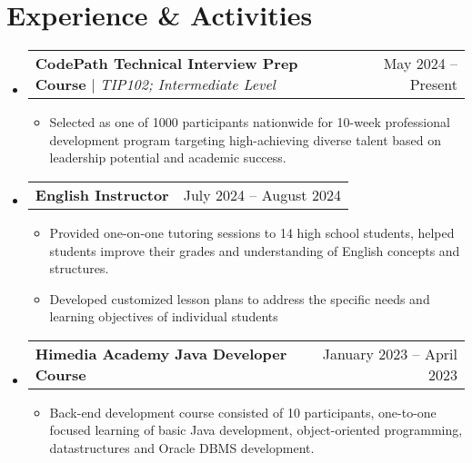 \documentclass[letterpaper,11pt]{article}
\makeatletter
\newcommand{\resumeItem}[1]{
  \item\small{
    {#1 \vspace{-3pt}}
  }
}
\newcommand{\resumeSubheading}[4]{
  \vspace{-2pt}\item
    \begin{tabular*}{0.97\textwidth}[t]{l@{\extracolsep{\fill}}r@{\hspace{-0.2in}}}
        \textbf{#1} & #2 \\
        \textit{\small#3} & \textit{\small #4} \\
    \end{tabular*}\vspace{-1pt}
}
\newcommand{\resumeProjectHeading}[2]{
    \item
    \begin{tabular*}{0.97\textwidth}{l@{\extracolsep{\fill}}r@{\hspace{-0.2in}}}
        \small#1 & #2 \\
    \end{tabular*}\vspace{-7pt}
}
\newcommand{\resumeSubHeadingListStart}{\begin{itemize}[leftmargin=0.00in, rightmargin=-0.2in, label={}]}
\newcommand{\resumeSubHeadingListEnd}{\end{itemize}}
\newcommand{\resumeItemListStart}{\begin{itemize}[leftmargin=0.15in, rightmargin=0.15in]}
\newcommand{\resumeItemListEnd}{\end{itemize}\vspace{-3pt}}
\makeatother
\begin{document}



\section{Experience \& Activities}
    \resumeSubHeadingListStart
        \resumeProjectHeading
            {\textbf{CodePath Technical Interview Prep Course} $|$ \emph{TIP102; Intermediate Level}}{May 2024 -- Present}
            \resumeItemListStart
                \resumeItem{Selected as one of 1000 participants nationwide for 10-week professional development program targeting high-achieving diverse talent based on leadership potential and academic success.}
            \resumeItemListEnd
        \resumeSubHeadingListEnd

    \resumeSubHeadingListStart
        \resumeProjectHeading
            {\textbf{English Instructor}}{July 2024 -- August 2024}
            \resumeItemListStart
                \resumeItem{Provided one-on-one tutoring sessions to 14 high school students, helped students improve their grades and understanding of English concepts and structures.}
                \resumeItem{Developed customized lesson plans to address the specific needs and learning objectives of individual students}
            \resumeItemListEnd
        \resumeSubHeadingListEnd

    \resumeSubHeadingListStart
        \resumeProjectHeading
            {\textbf{Himedia Academy Java Developer Course}}{January 2023 -- April 2023}
            \resumeItemListStart
                \resumeItem{Back-end development course consisted of 10 participants, one-to-one focused learning of basic Java development, object-oriented programming, datastructures and Oracle DBMS development.}
            \resumeItemListEnd
        \resumeSubHeadingListEnd
\end{document}
